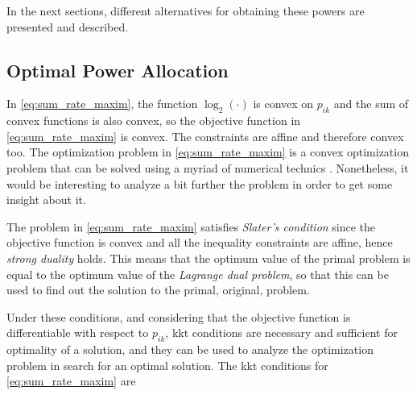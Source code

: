 In the next sections, different alternatives for obtaining these powers are
presented and described.

\subsection{Optimal Power Allocation}\label{ssec:optimal_power_allocation}

In \eqref{eq:sum_rate_maxim}, the function $\log_2(\cdot)$ is convex on $p_{ik}$
 and the sum of convex functions is also convex, so the objective function in
\eqref{eq:sum_rate_maxim} is convex. The constraints are affine and therefore
convex too. The optimization problem in \eqref{eq:sum_rate_maxim} is a convex
optimization problem that can be solved using a myriad of numerical technics
\cite{boyd_convex}. Nonetheless, it would be interesting to analyze a bit
further the problem in order to get some insight about it.

The problem in \eqref{eq:sum_rate_maxim} satisfies \emph{Slater's condition}
\cite{boyd_convex} since the objective function is convex and all the
inequality constraints are affine, hence \emph{strong duality} holds. This means
that the optimum value of the primal problem is equal to the optimum value of
the \emph{Lagrange dual problem}, so that this can be used to find out the
solution to the primal, original, problem.

Under these conditions, and considering that the objective function is
differentiable with respect to $p_{ik}$, \gls{kkt} conditions \cite{boyd_convex}
are necessary and sufficient for optimality of a solution, and they can be used
to analyze the optimization problem in search for an optimal solution. The
\gls{kkt} conditions for \eqref{eq:sum_rate_maxim} are

